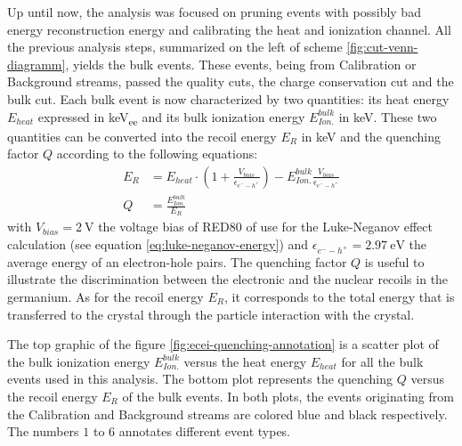 Up until now, the analysis was focused on pruning events with possibly bad energy reconstruction energy and calibrating the heat and ionization channel. All the previous analysis steps, summarized on the left of scheme \ref{fig:cut-venn-diagramm}, yields the bulk events. These events, being from Calibration or Background streams, passed the quality cuts, the charge conservation cut and the bulk cut.
Each bulk event is now characterized by two quantities: its heat energy $E_{heat}$ expressed in \si{\kilo\eV_{ee}} and its bulk ionization energy 
$E_{Ion.}^{bulk}$ in \si{\kilo\eV}.
These two quantities can be converted into the recoil energy $E_R$ in \si{\kilo\eV} and the quenching factor $Q$ according to the following equations:
\begin{align}
\label{eq:er-quenching}
E_R 
&= 
E_{heat}
\cdot
\left( 1 + \frac{V_{bias}}{\epsilon_{e^--h^+}} \right) - E_{Ion.}^{bulk} \frac{V_{bias}}{\epsilon_{e^--h^+}}
\\
Q &= \frac{E_{Ion.}^{bulk}}{E_R}
\end{align}
with $V_{bias}=\SI{2}{\volt}$ the voltage bias of RED80 of use for the Luke-Neganov effect calculation (see equation \ref{eq:luke-neganov-energy}) and $\epsilon_{e^--h^+}=\SI{2.97}{\eV}$ the average energy of an electron-hole pairs.
The quenching factor $Q$ is useful to illustrate the discrimination between the electronic and the nuclear recoils in the germanium. As for the recoil energy $E_R$, it corresponds to the total energy that is transferred to the crystal through the particle interaction with the crystal.

The top graphic of the figure \ref{fig:ecei-quenching-annotation} is a scatter plot of the bulk ionization energy $E_{Ion.}^{bulk}$ versus the heat energy $E_{heat}$ for all the bulk events used in this analysis. The bottom plot represents the quenching $Q$ versus the recoil energy $E_R$ of the bulk events. In both plots, the events originating from the Calibration and Background streams are colored blue and black respectively. The numbers $1$ to $6$ annotates different event types.

